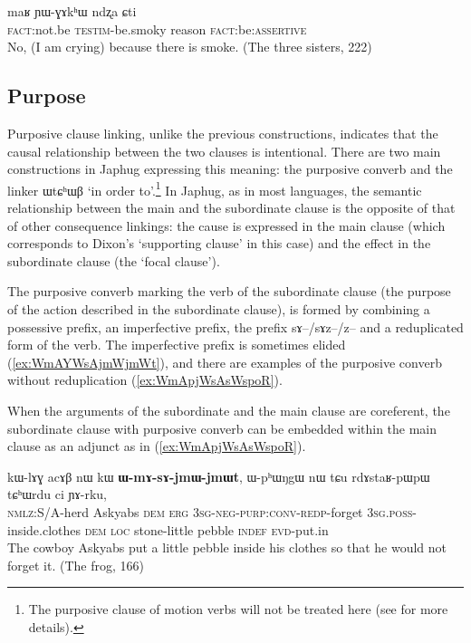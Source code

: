 \documentclass[oldfontcommands,oneside,a4paper,11pt]{article}
\newcommand{\ipa}[1]{{\phon \mbox{#1}}} %
\newcommand{\refb}[1]{(\ref{#1})}
\begin{document}
\begin{exe}
\ex \label{ex:YWGAkhW.ndzxa}
\gll
\ipa{maʁ}   	\ipa{ɲɯ-ɣɤkʰɯ}   	\ipa{ndʐa}   	\ipa{ɕti}   \\
\textsc{fact}:not.be \textsc{testim}-be.smoky reason \textsc{fact}:be:\textsc{assertive} \\
\glt No, (I am crying) because there is smoke. (The three sisters, 222) 
\end{exe} 
 

\subsection{Purpose} \label{sec:purposive}

Purposive clause linking, unlike the previous constructions, indicates that the causal relationship between the two clauses is intentional. There are two main constructions in Japhug expressing this meaning: the purposive converb and the linker \ipa{ɯtɕʰɯβ} `in order to'.\footnote{The purposive clause of motion verbs will not be treated here (see \citet{jacques13harmonization} for more details).} In Japhug, as in most languages, the semantic relationship between the main and the subordinate clause is the opposite of that of other consequence linkings: the cause is expressed in the main clause (which corresponds to Dixon's `supporting clause' in this case) and the effect in the subordinate clause (the `focal clause').

The purposive converb marking the verb of the subordinate clause (the purpose of the action described in the subordinate clause), is formed by combining a possessive prefix, an imperfective prefix, the prefix \ipa{sɤ}--/\ipa{sɤz}--/\ipa{z}-- and a reduplicated form of the verb. The imperfective prefix is sometimes elided \refb{ex:WmAYWsAjmWjmWt}, and there are examples of the purposive converb without reduplication \refb{ex:WmApjWsAsWspoR}.  

When the arguments of the subordinate and the main clause are coreferent, the subordinate clause with purposive converb can be embedded within the main clause as an adjunct as in \refb{ex:WmApjWsAsWspoR}.
 
\begin{exe}
\ex \label{ex:WmAYWsAjmWjmWt}
\gll
  \ipa{kɯ-lɤɣ}   	\ipa{acɤβ}   	\ipa{nɯ}   	\ipa{kɯ}   	\ipa{\textbf{ɯ-mɤ-sɤ-jmɯ-jmɯt}},   	\ipa{ɯ-pʰɯŋgɯ}   	\ipa{nɯ}   	\ipa{tɕu}   	\ipa{rdɤstaʁ-pɯpɯ}   	\ipa{tɕʰɯrdu}   	\ipa{ci}  \ipa{ɲɤ-rku,}\\
 \textsc{nmlz}:S/A-herd Askyabs \textsc{dem} \textsc{erg}  \textsc{3sg-neg-purp:conv-redp}-forget \textsc{3sg.poss}-inside.clothes \textsc{dem} \textsc{loc} stone-little pebble \textsc{indef}
 \textsc{evd}-put.in\\
\glt The cowboy Askyabs put a little pebble inside his clothes so that he would not forget it. (The frog, 166)
\end{exe}
 
\end{document}
